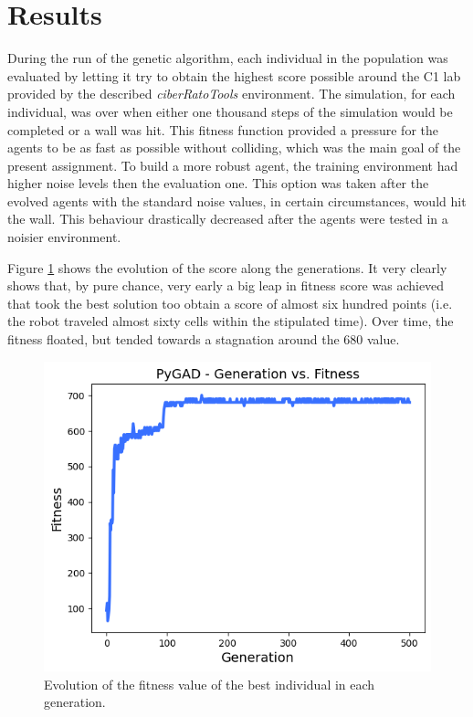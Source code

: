 \documentclass[runningheads]{llncs}
\begin{document}
\section{Results}
\label{sec:results}

During the run of the genetic algorithm, each individual in the population was evaluated by letting it try to obtain the highest score possible around the C1 lab provided by the described \textit{ciberRatoTools} environment. The simulation, for each individual, was over when either one thousand steps of the simulation would be completed or a wall was hit. This fitness function provided a pressure for the agents to be as fast as possible without colliding, which was the main goal of the present assignment. To build a more robust agent, the training environment had higher noise levels then the evaluation one. This option was taken after the evolved agents with the standard noise values, in certain circumstances, would hit the wall. This behaviour drastically decreased after the agents were tested in a noisier environment.

Figure \ref{fig:evolution_by_generation} shows the evolution of the score along the generations. It very clearly shows that, by pure chance, very early a big leap in fitness score was achieved that took the best solution too obtain a score of almost six hundred points (i.e. the robot traveled almost sixty cells within the stipulated time). Over time, the fitness floated, but tended towards a stagnation around the 680 value.

\begin{figure}
    \centering
    \includegraphics[width=\textwidth]{imgs/graph_690_2022.01.27_16.53.06.png}
    \caption{Evolution of the fitness value of the best individual in each generation.} 
    \label{fig:evolution_by_generation}
\end{figure}
\FloatBarrier
\end{document}
